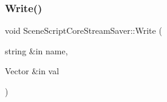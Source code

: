 \hypertarget{class_scene_script_core_stream_saver_a31fa71fcfd64aeb1e6195a0a66020e0d}{}\label{class_scene_script_core_stream_saver_a31fa71fcfd64aeb1e6195a0a66020e0d} 
\subsubsection{\texorpdfstring{Write()}{Write()}\hspace{0.1cm}{\footnotesize\ttfamily [6/6]}}
{\footnotesize\ttfamily void Scene\+Script\+Core\+Stream\+Saver\+::\+Write (\begin{DoxyParamCaption}\item[{string \&in}]{name,  }\item[{Vector \&in}]{val }\end{DoxyParamCaption})}

